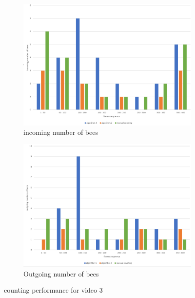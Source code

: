 \documentclass[10pt,twocolumn,letterpaper]{article}
\begin{document}
\begin{figure}[H]
\centering
    \begin{subfigure}[b]{0.35\textwidth}
        \includegraphics[width=\textwidth]{graphs/video3_incoming_number_of_bees}
        \caption{incoming number of bees}
        \label{fig:vdo3i}
    \end{subfigure}
    \begin{subfigure}[b]{0.35\textwidth}
        \includegraphics[width=\textwidth]{graphs/video3_outgoing_number_of_bees}
        \caption{Outgoing number of bees}
        \label{fig:vdo3o}
    \end{subfigure}
    \caption{counting performance for video 3}
\label{fig:????}
\end{figure}
\end{document}
